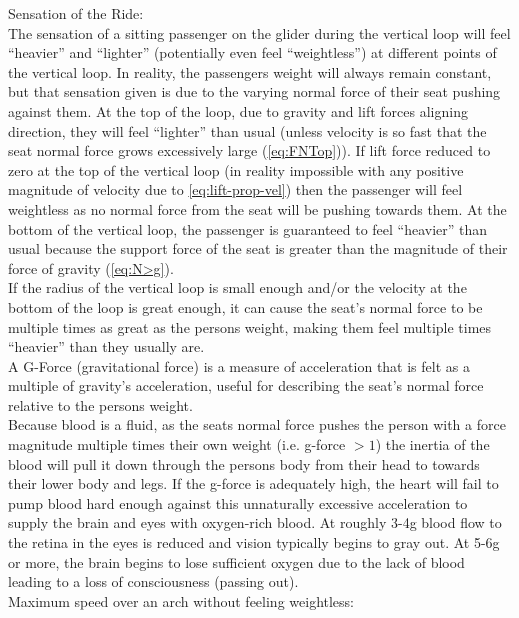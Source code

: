 \documentclass[11pt, a4paper]{article}
\def\ParagraphSpacing{30pt}
\begin{document}
	\Large Sensation of the Ride:\\ \normalsize
	The sensation of a sitting passenger on the glider during the vertical loop will feel ``heavier'' and ``lighter'' (potentially even feel ``weightless'') at different points of the vertical loop. In reality, the passengers weight will always remain constant, but that sensation given is due to the varying normal force of their seat pushing against them. At the top of the loop, due to gravity and lift forces aligning direction, they will feel ``lighter'' than usual (unless velocity is so fast that the seat normal force grows excessively large (\cref{eq:FNTop})). If lift force reduced to zero at the top of the vertical loop (in reality impossible with any positive magnitude of velocity due to \cref{eq:lift-prop-vel}) then the passenger will feel weightless as no normal force from the seat will be pushing towards them. At the bottom of the vertical loop, the passenger is guaranteed to feel ``heavier'' than usual because the support force of the seat is greater than the magnitude of their force of gravity (\cref{eq:N>g}).\\
	If the radius of the vertical loop is small enough and/or the velocity at the bottom of the loop is great enough, it can cause the seat's normal force to be multiple times as great as the persons weight, making them feel multiple times ``heavier'' than they usually are.\\
	A G-Force (gravitational force) is a measure of acceleration that is felt as a multiple of gravity's acceleration, useful for describing the seat's normal force relative to the persons weight.\\
	Because blood is a fluid, as the seats normal force pushes the person with a force magnitude multiple times their own weight (i.e. g-force $>1$) the inertia of the blood will pull it down through the persons body from their head to towards their lower body and legs. If the g-force is adequately high, the heart will fail to pump blood hard enough against this unnaturally excessive acceleration to supply the brain and eyes with oxygen-rich blood. At roughly 3-4g blood flow to the retina in the eyes is reduced and vision typically begins to gray out. At 5-6g or more, the brain begins to lose sufficient oxygen due to the lack of blood leading to a loss of consciousness (passing out).\\[\ParagraphSpacing]
	\Large Maximum speed over an arch without feeling weightless:\\ \normalsize
\end{document}
